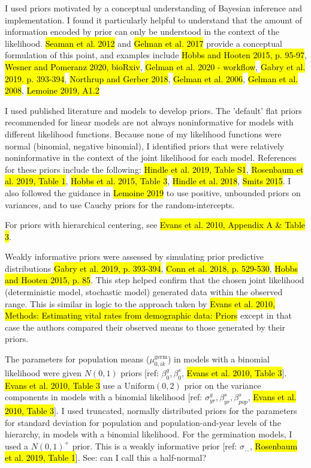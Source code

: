 \documentclass[12pt, oneside, titlepage]{article}   	%
\begin{document}

I used priors motivated by a conceptual understanding of Bayesian inference and implementation. I found it particularly helpful to understand that the amount of information encoded by prior can only be understood in the context of the likelihood. \hl{Seaman et al. 2012} and \hl{Gelman et al. 2017} provide a conceptual formulation of this point, and examples include \hl{Hobbs and Hooten 2015, p. 95-97}, \hl{Wesner and Pomeranz 2020, bioRxiv}, \hl{Gelman et al. 2020 - workflow}, \hl{Gabry et al. 2019. p. 393-394}, \hl{Northrup and Gerber 2018}, \hl{Gelman et al. 2006}, \hl{Gelman et al. 2008}, \hl{Lemoine 2019, A1.2}

I used published literature and models to develop priors. The 'default' flat priors recommended for linear models are not always noninformative for models with different likelihood functions. Because none of my likelihood functions were normal (binomial, negative binomial), I identified priors that were relatively noninformative in the context of the joint likelihood for each model. References for these priors include the following: \hl{Hindle et al. 2019, Table S1}, \hl{Rosenbaum et al. 2019, Table 1}, \hl{Hobbs et al. 2015, Table 3}, \hl{Hindle et al. 2018}, \hl{Smits 2015}. I also followed the guidance in \hl{Lemoine 2019} to use positive, unbounded priors on variances, and to use Cauchy priors for the random-intercepts. 

For priors with hierarchical centering, see \hl{Evans et al. 2010, Appendix A \& Table 3}.

Weakly informative priors were assessed by simulating prior predictive distributions \hl{Gabry et al. 2019, p. 393-394}, \hl{Conn et al. 2018, p. 529-530}, \hl{Hobbs and Hooten 2015, p. 85}. This step helped confirm that the chosen joint likelihood (deterministic model, stochastic model) generated data within the observed range. This is similar in logic to the approach taken by \hl{Evans et al. 2010, Methods: Estimating vital rates from demographic data: Priors} except in that case the authors compared their observed means to those generated by their priors.

The parameters for population means ($\mu_{0,ik}^\mathrm{germ}$) in models with a binomial likelihood were given $N(0,1)$ priors [ref: $\beta_0^g, \beta_0^s$, \hl{Evans et al. 2010, Table 3}]. \hl{Evans et al. 2010, Table 3} use a $\mathrm{Uniform}(0,2)$ prior on the variance components in models with a binomial likelihood [ref: $\sigma_{yr}^g, \beta_{yr}^s, \beta_{pop}^s$, \hl{Evans et al. 2010, Table 3}]. I used truncated, normally distributed priors for the parameters for standard deviation for population and population-and-year levels of the hierarchy, in models with a binomial likelihood. For the germination models, I used a $N(0,1)^+$ prior. This is a weakly informative prior [ref: $\sigma_{\dots}$, \hl{Rosenbaum et al. 2019, Table 1}]. See: can I call this a half-normal? 
\end{document}
